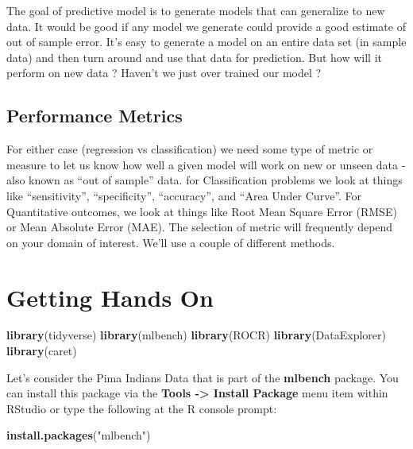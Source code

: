 \documentclass[]{book}
\newenvironment{Shaded}{\begin{snugshade}}{\end{snugshade}}
\newcommand{\KeywordTok}[1]{\textcolor[rgb]{0.13,0.29,0.53}{\textbf{#1}}}
\newcommand{\StringTok}[1]{\textcolor[rgb]{0.31,0.60,0.02}{#1}}
\newcommand{\NormalTok}[1]{#1}
\begin{document}
The goal of predictive model is to generate models that can generalize
to new data. It would be good if any model we generate could provide a
good estimate of out of sample error. It's easy to generate a model on
an entire data set (in sample data) and then turn around and use that
data for prediction. But how will it perform on new data ? Haven't we
just over trained our model ?

\section{Performance Metrics}\label{performance-metrics}

For either case (regression vs classification) we need some type of
metric or measure to let us know how well a given model will work on new
or unseen data - also known as ``out of sample'' data. for
Classification problems we look at things like ``sensitivity'',
``specificity'', ``accuracy'', and ``Area Under Curve''. For
Quantitative outcomes, we look at things like Root Mean Square Error
(RMSE) or Mean Absolute Error (MAE). The selection of metric will
frequently depend on your domain of interest. We'll use a couple of
different methods.

\chapter{Getting Hands On}\label{getting-hands-on}

\begin{Shaded}
\begin{Highlighting}[]
\KeywordTok{library}\NormalTok{(tidyverse)}
\KeywordTok{library}\NormalTok{(mlbench)}
\KeywordTok{library}\NormalTok{(ROCR)}
\KeywordTok{library}\NormalTok{(DataExplorer)}
\KeywordTok{library}\NormalTok{(caret)}
\end{Highlighting}
\end{Shaded}

Let's consider the Pima Indians Data that is part of the
\textbf{mlbench} package. You can install this package via the
\textbf{Tools -\textgreater{} Install Package} menu item within RStudio
or type the following at the R console prompt:

\begin{Shaded}
\begin{Highlighting}[]
\KeywordTok{install.packages}\NormalTok{(}\StringTok{"mlbench"}\NormalTok{)}
\end{Highlighting}
\end{Shaded}
\end{document}
